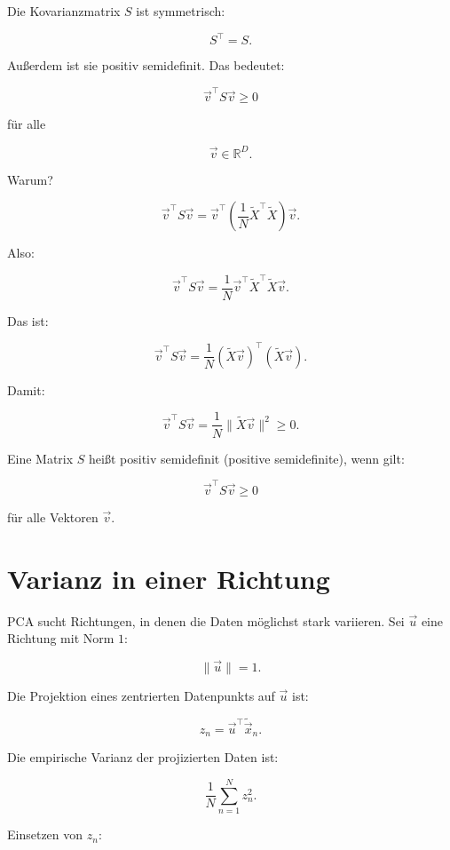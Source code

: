 Die Kovarianzmatrix \(S\) ist symmetrisch:

\[
    S^{\top}
    =
    S.
\]

Außerdem ist sie positiv semidefinit.
Das bedeutet:

\[
    \vec{v}^{\top}S\vec{v}
    \geq
    0
\]

für alle

\[
    \vec{v}\in\mathbb{R}^D.
\]

Warum?

\[
    \vec{v}^{\top}S\vec{v}
    =
    \vec{v}^{\top}
    \left(
        \frac{1}{N}
        \tilde{X}^{\top}\tilde{X}
    \right)
    \vec{v}.
\]

Also:

\[
    \vec{v}^{\top}S\vec{v}
    =
    \frac{1}{N}
    \vec{v}^{\top}
    \tilde{X}^{\top}\tilde{X}
    \vec{v}.
\]

Das ist:

\[
    \vec{v}^{\top}S\vec{v}
    =
    \frac{1}{N}
    (\tilde{X}\vec{v})^{\top}
    (\tilde{X}\vec{v}).
\]

Damit:

\[
    \vec{v}^{\top}S\vec{v}
    =
    \frac{1}{N}
    \|\tilde{X}\vec{v}\|^2
    \geq
    0.
\]

\begin{definitionbox}
Eine Matrix \(S\) heißt positiv semidefinit (positive semidefinite), wenn gilt:

\[
    \vec{v}^{\top}S\vec{v}\geq 0
\]

für alle Vektoren \(\vec{v}\).
\end{definitionbox}

\section{Varianz in einer Richtung}

PCA sucht Richtungen, in denen die Daten möglichst stark variieren.
Sei \(\vec{u}\) eine Richtung mit Norm \(1\):

\[
    \|\vec{u}\|=1.
\]

Die Projektion eines zentrierten Datenpunkts auf \(\vec{u}\) ist:

\[
    z_n
    =
    \vec{u}^{\top}\tilde{\vec{x}}_n.
\]

Die empirische Varianz der projizierten Daten ist:

\[
    \frac{1}{N}
    \sum_{n=1}^{N}
    z_n^2.
\]

Einsetzen von \(z_n\):

